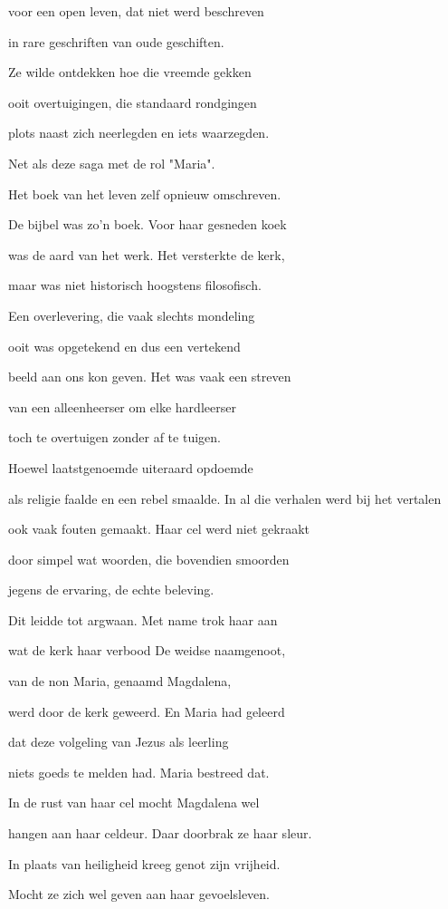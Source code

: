 voor een open leven,
dat niet werd beschreven

in rare geschriften
van oude geschiften.

Ze wilde ontdekken
hoe die vreemde gekken

ooit overtuigingen,
die standaard rondgingen

plots naast zich neerlegden
en iets waarzegden.

Net als deze saga
met de rol "Maria".

Het boek van het leven
zelf opnieuw omschreven.

De bijbel was zo’n boek.
Voor haar gesneden koek

was de aard van het werk.
Het versterkte de kerk,

maar was niet historisch
hoogstens filosofisch.

Een overlevering,
die vaak slechts mondeling

ooit was opgetekend
en dus een vertekend

beeld aan ons kon geven.
Het was vaak een streven

van een alleenheerser
om elke hardleerser

toch te overtuigen
zonder af te tuigen.

Hoewel laatstgenoemde
uiteraard opdoemde

als religie faalde
en een rebel smaalde.
In al die verhalen
werd bij het vertalen

ook vaak fouten gemaakt.
Haar cel werd niet gekraakt

door simpel wat woorden,
die bovendien smoorden

jegens de ervaring,
de echte beleving.

Dit leidde tot argwaan.
Met name trok haar aan

wat de kerk haar verbood
De weidse naamgenoot,

van de non Maria,
genaamd Magdalena,

werd door de kerk geweerd.
En Maria had geleerd

dat deze volgeling
van Jezus als leerling

niets goeds te melden had.
Maria bestreed dat.

In de rust van haar cel
mocht Magdalena wel

hangen aan haar celdeur.
Daar doorbrak ze haar sleur.

In plaats van heiligheid
kreeg genot zijn vrijheid.

Mocht ze zich wel geven
aan haar gevoelsleven.

